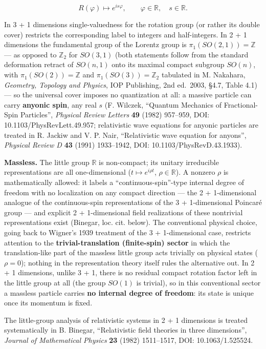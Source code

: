 \documentclass[
]{article}
\begin{document}
\[R(\varphi) \longmapsto e^{i s \varphi}, \qquad \varphi \in \mathbb{R}, \quad s \in \mathbb{R}. \tag{73}\]

In 3 + 1 dimensions single-valuedness for the rotation group (or rather
its double cover) restricts the corresponding label to integers and
half-integers. In 2 + 1 dimensions the fundamental group of the Lorentz
group is \(\pi_{1}(SO(2,1)) = \mathbb{Z}\) --- as opposed to
\(\mathbb{Z}_{2}\) for \(SO(3,1)\) (both statements follow from the
standard deformation retract of \(SO(n,1)\) onto its maximal compact
subgroup \(SO(n)\), with \(\pi_{1}(SO(2)) = \mathbb{Z}\) and
\(\pi_{1}(SO(3)) = \mathbb{Z}_{2}\) tabulated in M. Nakahara,
\emph{Geometry, Topology and Physics}, IOP Publishing, 2nd ed.~2003,
§4.7, Table 4.1) --- so the universal cover imposes no quantization at
all: a massive particle can carry \textbf{anyonic spin}, any real \(s\)
(F. Wilczek, ``Quantum Mechanics of Fractional-Spin Particles'',
\emph{Physical Review Letters} \textbf{49} (1982) 957--959, DOI:
10.1103/PhysRevLett.49.957; relativistic wave equations for anyonic
particles are treated in R. Jackiw and V. P. Nair, ``Relativistic wave
equation for anyons'', \emph{Physical Review D} \textbf{43} (1991)
1933--1942, DOI: 10.1103/PhysRevD.43.1933).

\textbf{Massless.} The little group \(\mathbb{R}\) is non-compact; its
unitary irreducible representations are all one-dimensional
(\(t \mapsto e^{i\rho t}\), \(\rho \in \mathbb{R}\)). A nonzero \(\rho\)
is mathematically allowed: it labels a ``continuous-spin''-type internal
degree of freedom with no localization on any compact direction --- the
2 + 1-dimensional analogue of the continuous-spin representations of the
3 + 1-dimensional Poincaré group --- and explicit 2 + 1-dimensional
field realizations of these nontrivial representations exist (Binegar,
loc. cit. below). The conventional physical choice, going back to
Wigner's 1939 treatment of the 3 + 1-dimensional case, restricts
attention to the \textbf{trivial-translation (finite-spin) sector} in
which the translation-like part of the massless little group acts
trivially on physical states (\(\rho = 0\)); nothing in the
representation theory itself rules the alternative out. In 2 + 1
dimensions, unlike 3 + 1, there is no residual compact rotation factor
left in the little group at all (the group \(SO(1)\) is trivial), so in
this conventional sector a massless particle carries \textbf{no internal
degree of freedom}: its state is unique once its momentum is fixed.

The little-group analysis of relativistic systems in 2 + 1 dimensions is
treated systematically in B. Binegar, ``Relativistic field theories in
three dimensions'', \emph{Journal of Mathematical Physics} \textbf{23}
(1982) 1511--1517, DOI: 10.1063/1.525524.
\end{document}
